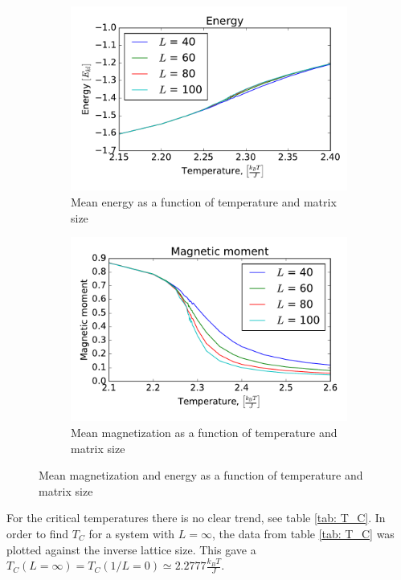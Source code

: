 	\begin{figure}[H]
	\begin{subfigure}[b]{0.5\textwidth}
	\includegraphics[width=1\linewidth]{../results/4e/4e_energy}
\caption{Mean energy as a function of temperature and matrix size}
\label{fig:4eenergy}
	\end{subfigure}
	\hfill
	\begin{subfigure}[b]{0.5\textwidth}
	\includegraphics[width=1\linewidth]{../results/4e/4e_mag}
\caption{Mean magnetization as a function of temperature and matrix size}
\label{fig:4emag}
	\end{subfigure}
	\caption{Mean magnetization and energy as a function of temperature and matrix size}
\end{figure}

For the critical temperatures there is no clear trend, see table \ref{tab: T_C}. In order to find $ T_C $ for a system with $ L=\infty $, the data from table \ref{tab: T_C} was plotted against the inverse lattice size. This gave a $ T_C(L = \infty) =T_C(1/L = 0) \simeq 2.2777  \frac{k_BT}{J}  $. 

